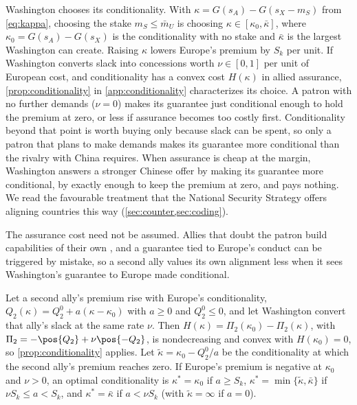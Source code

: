 Washington chooses its conditionality. With $\kappa=G(s_A)-G(s_X-m_S)$ from \cref{eq:kappa}, choosing the stake $m_S\le\bar m_U$ is choosing $\kappa\in[\kappa_0,\bar\kappa]$, where $\kappa_0=G(s_A)-G(s_X)$ is the conditionality with no stake and $\bar\kappa$ is the largest Washington can create. Raising $\kappa$ lowers Europe's premium by $S_k$ per unit. If Washington converts slack into concessions worth $\nu\in[0,1]$ per unit of European cost, and conditionality has a convex cost $H(\kappa)$ in allied assurance, \cref{prop:conditionality} in \cref{app:conditionality} characterizes its choice. A patron with no further demands ($\nu=0$) makes its guarantee just conditional enough to hold the premium at zero, or less if assurance becomes too costly first. Conditionality beyond that point is worth buying only because slack can be spent, so only a patron that plans to make demands makes its guarantee more conditional than the rivalry with China requires. When assurance is cheap at the margin, Washington answers a stronger Chinese offer by making its guarantee more conditional, by exactly enough to keep the premium at zero, and pays nothing. We read the favourable treatment that the National Security Strategy offers aligning countries this way (\cref{sec:counter,sec:coding}).

The assurance cost need not be assumed. Allies that doubt the patron build capabilities of their own \citep{lanoszka2018atomic}, and a guarantee tied to Europe's conduct can be triggered by mistake, so a second ally values its own alignment less when it sees Washington's guarantee to Europe made conditional.

\begin{remark}\label{rem:assurance}
Let a second ally's premium rise with Europe's conditionality, $Q_2(\kappa)=Q_2^0+a(\kappa-\kappa_0)$ with $a\ge 0$ and $Q_2^0\le 0$, and let Washington convert that ally's slack at the same rate $\nu$. Then $H(\kappa)=\Pi_2(\kappa_0)-\Pi_2(\kappa)$, with $\Pi_2=-\pos{Q_2}+\nu\pos{-Q_2}$, is nondecreasing and convex with $H(\kappa_0)=0$, so \cref{prop:conditionality} applies. Let $\tilde\kappa=\kappa_0-Q_2^0/a$ be the conditionality at which the second ally's premium reaches zero. If Europe's premium is negative at $\kappa_0$ and $\nu>0$, an optimal conditionality is $\kappa^*=\kappa_0$ if $a\ge S_k$, $\kappa^*=\min\{\tilde\kappa,\bar\kappa\}$ if $\nu S_k\le a<S_k$, and $\kappa^*=\bar\kappa$ if $a<\nu S_k$ (with $\tilde\kappa=\infty$ if $a=0$).
\end{remark}

